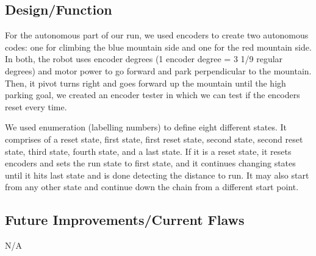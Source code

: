 \documentclass[11pt,fleqn]{article}
\begin{document}
\subsection*{Design/Function} 

For the autonomous part of our run, we used encoders to create two autonomous codes: one for
climbing the blue mountain side and one for the red mountain side. In both, the robot uses encoder
degrees (1 encoder degree = 3 1/9 regular degrees) and motor power to go forward and park
perpendicular to the mountain. Then, it pivot turns right and goes forward up the mountain until the
high parking goal, we created an encoder tester in which we can test if the encoders reset every
time.

We used enumeration (labelling numbers) to define eight different states. It comprises of a reset
state, first state, first reset state, second state, second reset state, third state, fourth state,
and a last state. If it is a reset state, it resets encoders and sets the run state to first state,
and it continues changing states until it hits last state and is done detecting the distance to run.
It may also start from any other state and continue down the chain from a different start point.

\subsection*{Future Improvements/Current Flaws}

N/A
\end{document}
